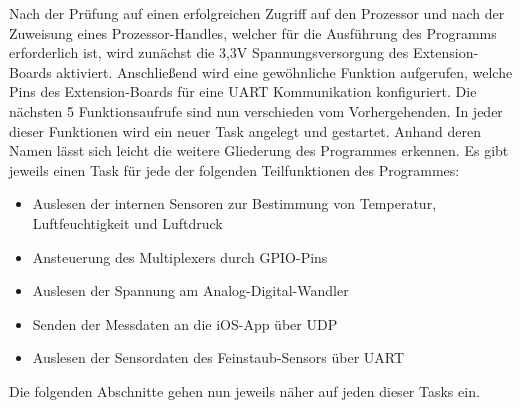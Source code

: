 Nach der Prüfung auf einen erfolgreichen Zugriff auf den Prozessor und nach der Zuweisung eines Prozessor-Handles, welcher für die Ausführung des Programms erforderlich ist, wird zunächst die 3,3V Spannungsversorgung des Extension-Boards aktiviert. Anschließend wird eine gewöhnliche Funktion aufgerufen, welche Pins des Extension-Boards für eine \acs{UART} Kommunikation konfiguriert. 
\newline
Die nächsten 5 Funktionsaufrufe sind nun verschieden vom Vorhergehenden. In jeder dieser Funktionen wird ein neuer Task angelegt und gestartet. Anhand deren Namen lässt sich leicht die weitere Gliederung des Programmes erkennen. 
\newline
Es gibt jeweils einen Task für jede der folgenden Teilfunktionen des Programmes:
\begin{itemize}
	\item Auslesen der internen Sensoren zur Bestimmung von Temperatur, Luftfeuchtigkeit und Luftdruck
	\item Ansteuerung des Multiplexers durch \acs{GPIO}-Pins 
	\item Auslesen der Spannung am Analog-Digital-Wandler
	\item Senden der Messdaten an die iOS-App über \acs{UDP}
	\item Auslesen der Sensordaten des Feinstaub-Sensors über \acs{UART}
\end{itemize}
Die folgenden Abschnitte gehen nun jeweils näher auf jeden dieser Tasks ein.

